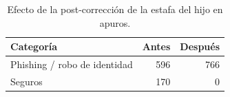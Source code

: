 \begin{table}
\caption{Efecto de la post-corrección de la estafa del hijo en apuros.}
\label{tab:postcorreccion_hijo_apuros}
\begin{tabular}{lrr}
\toprule
Categoría & Antes & Después \\
\midrule
Phishing / robo de identidad & 596 & 766 \\
Seguros & 170 & 0 \\
\bottomrule
\end{tabular}
\end{table}

